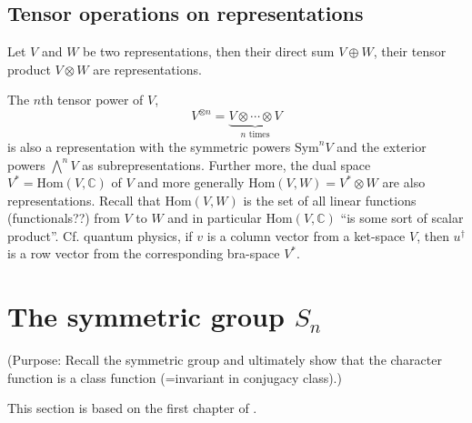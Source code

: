 \documentclass[12pt, a4paper, twoside]{article}
\newcommand{\C}{\mathbb{C}}
\newcommand{\Sym}{\text{Sym}}
\newcommand{\Hom}{\text{Hom}}
\newcommand{\1}{\mathbf{1}}
\theoremstyle{definition}
\theoremstyle{plain}
\theoremstyle{remark}
\newtheorem{example}[definition]{Example}
\begin{document}
	
	\subsection{Tensor operations on representations}
	
	Let $V$ and $W$ be two representations, then their direct sum $V \oplus W$, their tensor product $V \otimes W$ are representations.
	
	The $n$th tensor power of $V$, \[V^{\otimes n} = \underset{n \text{ times}}{\underbrace{V \otimes \cdots \otimes V}}\] is also a representation with the symmetric powers $\Sym^n V$ and the exterior powers $ \bigwedge^n V$ as subrepresentations. Further more, the dual space $V^* = \Hom(V,\C)$ of $V$ and more generally $\Hom(V,W) = V^* \otimes W$ are also representations. Recall that $\Hom(V,W)$ is the set of all linear functions (functionals??) from $V$ to $W$ and in particular $\Hom(V, \C)$ ``is some sort of scalar product''. Cf. quantum physics, if $v$ is a column vector from a ket-space $V$, then $u^\dagger$ is a row vector from the corresponding bra-space $V^*$.
	
	

\section{The symmetric group $S_n$}

	(Purpose: Recall the symmetric group and ultimately show that the character function is a class function (=invariant in conjugacy class).)
	
	This section is based on the first chapter of \cite{Sagan}.
\end{document}
